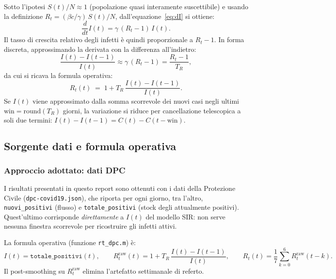 \documentclass[12pt, a4paper]{article}
\begin{document}
Sotto l'ipotesi $S(t)/N \approx 1$ (popolazione quasi interamente suscettibile)
e usando la definizione $R_t = (\beta c/\gamma)\,S(t)/N$, dall'equazione~\eqref{eq:dI} si ottiene:
\begin{equation}
    \frac{d}{dt}I(t) = \gamma\,(R_t - 1)\,I(t).
    \label{eq:I_growth}
\end{equation}
Il tasso di crescita relativo degli infetti è quindi proporzionale a $R_t - 1$.
In forma discreta, approssimando la derivata con la differenza all'indietro:
\begin{equation}
    \frac{I(t) - I(t-1)}{I(t)} \approx \gamma\,(R_t - 1) = \frac{R_t - 1}{T_R},
\end{equation}
da cui si ricava la formula operativa:
\begin{equation}
    \boxed{R_t(t) \;=\; 1 + T_R\,\frac{I(t) - I(t-1)}{I(t)}.}
    \label{eq:rt_base}
\end{equation}
Se $I(t)$ viene approssimato dalla somma scorrevole dei nuovi casi negli ultimi $\text{win} = \text{round}(T_R)$
giorni, la variazione si riduce per cancellazione telescopica a soli due termini:
$I(t) - I(t-1) = C(t) - C(t-\text{win})$.

\subsection{Sorgente dati e formula operativa}
\label{sub:dati}

\subsubsection*{Approccio adottato: dati DPC}

I risultati presentati in questo report sono ottenuti con i dati della Protezione Civile
(\texttt{dpc-covid19.json}), che riporta per ogni giorno, tra l'altro,
\texttt{nuovi\_positivi} (flusso) e \texttt{totale\_positivi} (stock degli attualmente positivi).
Quest'ultimo corrisponde \emph{direttamente} a $I(t)$ del modello SIR: non serve nessuna
finestra scorrevole per ricostruire gli infetti attivi.

La formula operativa (funzione \texttt{rt\_dpc.m}) è:
\begin{equation}
    I(t) = \texttt{totale\_positivi}(t), \qquad
    R_t^{\text{raw}}(t) = 1 + T_R\,\frac{I(t) - I(t-1)}{I(t)}, \qquad
    R_t(t) = \frac{1}{7}\sum_{k=0}^{6} R_t^{\text{raw}}(t-k).
    \label{eq:rt_dpc}
\end{equation}
Il post-smoothing su $R_t^{\text{raw}}$ elimina l'artefatto settimanale di referto.
\end{document}
